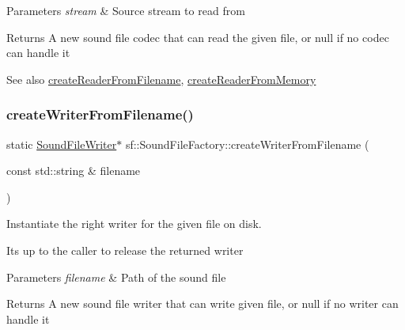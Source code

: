 \begin{DoxyParams}{Parameters}
{\em stream} & Source stream to read from\\
\hline
\end{DoxyParams}
\begin{DoxyReturn}{Returns}
A new sound file codec that can read the given file, or null if no codec can handle it
\end{DoxyReturn}
\begin{DoxySeeAlso}{See also}
\mbox{\hyperlink{classsf_1_1_sound_file_factory_af0a87110e0b8a77aada17b22a016c066}{create\+Reader\+From\+Filename}}, \mbox{\hyperlink{classsf_1_1_sound_file_factory_aee7a0ff1eace98d5325eaadc7d26d50c}{create\+Reader\+From\+Memory}} \begin{DoxyVerb}\end{DoxyVerb}
 
\end{DoxySeeAlso}
\mbox{\label{classsf_1_1_sound_file_factory_a0702eb2e8a4a171ba80c7fbd04c4defc}} 
\subsubsection{\texorpdfstring{createWriterFromFilename()}{createWriterFromFilename()}}
{\footnotesize\ttfamily static \mbox{\hyperlink{classsf_1_1_sound_file_writer}{Sound\+File\+Writer}}$\ast$ sf\+::\+Sound\+File\+Factory\+::create\+Writer\+From\+Filename (\begin{DoxyParamCaption}\item[{const std\+::string \&}]{filename }\end{DoxyParamCaption})\hspace{0.3cm}{\ttfamily [static]}}



Instantiate the right writer for the given file on disk. 

It\textquotesingle{}s up to the caller to release the returned writer


\begin{DoxyParams}{Parameters}
{\em filename} & Path of the sound file\\
\hline
\end{DoxyParams}
\begin{DoxyReturn}{Returns}
A new sound file writer that can write given file, or null if no writer can handle it \begin{DoxyVerb}\end{DoxyVerb}
 
\end{DoxyReturn}
\mbox{\label{classsf_1_1_sound_file_factory_acaf1f0bf1b7c7b9988ec76b33e33fe95}} 
